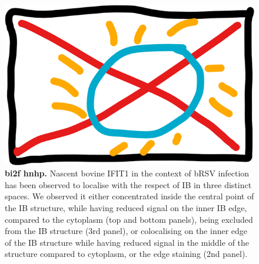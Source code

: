 \begin{figure}
    \centering
    \includegraphics[width=1\linewidth]{10. Chapter 5/Figs/00. placeholder.png}
    \caption[bi2f hnhp]{\textbf{bi2f hnhp.} Nascent bovine IFIT1 in the context of bRSV infection has been observed to localise with the respect of IB in three distinct spaces. We observed it either concentrated inside the central point of the IB structure, while having reduced signal on the inner IB edge, compared to the cytoplasm (top and bottom panels), being excluded from the IB structure (3rd panel), or colocalising on the inner edge of the IB structure while having reduced signal in the middle of the structure compared to cytoplasm, or the edge staining (2nd panel).}
    \label{fig:bi2f hnhp}
\end{figure}

